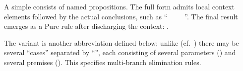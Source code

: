 \begin{isabellebody}
\begin{isamarkuptext}
  \medskip\noindent A simple  consists of named
  propositions.  The full form admits local context elements followed
  by the actual conclusions, such as ``\hyperlink{keyword.fixes}{\mbox{}}~~\hyperlink{keyword.assumes}{\mbox{}}~~\hyperlink{keyword.shows}{\mbox{}}~''.  The final result emerges as a Pure rule after discharging
  the context: .

  The \hyperlink{keyword.obtains}{\mbox{}} variant is another abbreviation defined
  below; unlike \hyperlink{command.obtain}{\mbox{}} (cf.\
  ) there may be several ``cases''
  separated by ``'', each consisting of several
  parameters (\isa{{\isaliteral{22}{\isachardoublequote}}vars{\isaliteral{22}{\isachardoublequote}}}) and several premises ().
  This specifies multi-branch elimination rules.


\end{isamarkuptext}
\end{isabellebody}
